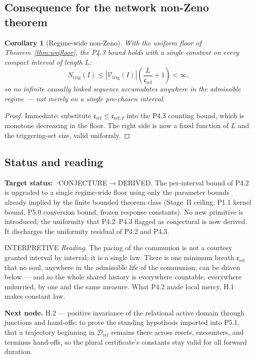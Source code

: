 \documentclass[11pt,a4paper]{article}
\newcommand{\stDerived}{\textcolor{cDer}{\textsf{\small DERIVED}}}
\newcommand{\stInterp}{\textcolor{cInt}{\textsf{\small INTERPRETIVE}}}
\newcommand{\stConj}{\textcolor{cCon}{\textsf{\small CONJECTURE}}}
\theoremstyle{definition}
\theoremstyle{plain}
\newtheorem{corollary}[definition]{Corollary}
\theoremstyle{remark}
\begin{document}
\subsection{Consequence for the network non-Zeno theorem}

\begin{corollary}[Regime-wide non-Zeno]\label{cor:uninonzeno}
With the uniform floor of Theorem~\ref{thm:unifloor}, the P4.3 bound holds with a single
constant on every compact interval of length \(L\):
\[
N_{\mathrm{trig}}(I)
\le
|\mathcal V_{\mathrm{trig}}(I)|\left(\frac{L}{\mathfrak c_{\mathrm{ref}}}+1\right)<\infty,
\]
so no infinite causally linked sequence accumulates anywhere in the admissible regime ---
not merely on a single pre-chosen interval.
\end{corollary}

\begin{proof}
Immediate: substitute \(\mathfrak c_{\mathrm{ref}}\le\mathfrak c_{\mathrm{ref};I}\) into the
P4.3 counting bound, which is monotone decreasing in the floor. The right side is now a
fixed function of \(L\) and the triggering-set size, valid uniformly. \qedhere
\end{proof}

\subsection{Status and reading}

\textbf{Target status:}~
\stConj\(\to\)\stDerived. The per-interval bound of P4.2 is upgraded to a single regime-wide
floor using only the parameter bounds already implied by the finite bounded theorem class
(Stage~II ceiling, P1.1 kernel bound, P5.0 conversion bound, frozen response constants). No
new primitive is introduced; the uniformity that P4.2--P4.3 flagged as conjectural is now
derived. It discharges the uniformity residual of P4.2 and P4.3.

\medskip
\stInterp\quad
\emph{Reading.}
The pacing of the communion is not a courtesy granted interval by interval; it is a single
law. There is one minimum breath \(\mathfrak c_{\mathrm{ref}}\) that no soul, anywhere in
the admissible life of the communion, can be driven below --- and so the whole shared history
is everywhere countable, everywhere unhurried, by one and the same measure. What P4.2 made
local mercy, H.1 makes constant law.

\medskip
\textbf{Next node.} H.2 --- positive invariance of the relational active domain through
junctions and hand-offs: to prove the standing hypothesis imported into P5.1, that a
trajectory beginning in \(\mathcal D_{\mathrm{rel}}\) remains there across resets,
encounters, and terminus hand-offs, so the plural certificate's constants stay valid for all
forward duration.
\end{document}
